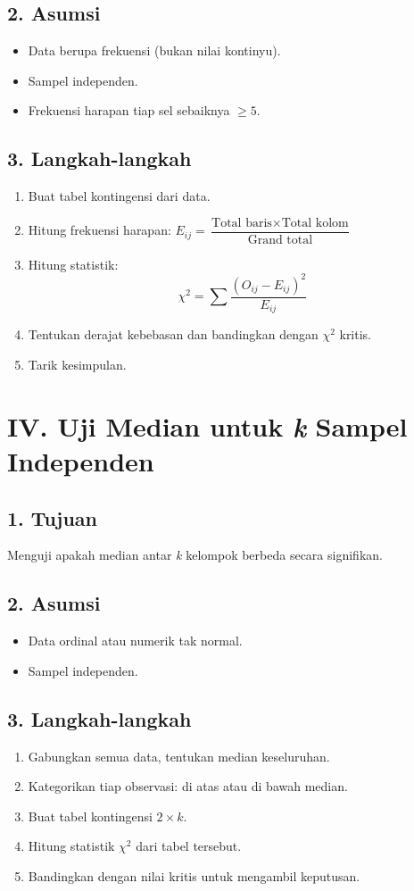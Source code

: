 \documentclass[12pt]{article}
\begin{document}
	\subsection*{2. Asumsi}
	\begin{itemize}
		\item Data berupa frekuensi (bukan nilai kontinyu).
		\item Sampel independen.
		\item Frekuensi harapan tiap sel sebaiknya $\geq 5$.
	\end{itemize}
	
	\subsection*{3. Langkah-langkah}
	\begin{enumerate}
		\item Buat tabel kontingensi dari data.
		\item Hitung frekuensi harapan: $E_{ij} = \dfrac{\text{Total baris} \times \text{Total kolom}}{\text{Grand total}}$
		\item Hitung statistik:
		\[
		\chi^2 = \sum \frac{(O_{ij} - E_{ij})^2}{E_{ij}}
		\]
		\item Tentukan derajat kebebasan dan bandingkan dengan $\chi^2$ kritis.
		\item Tarik kesimpulan.
	\end{enumerate}
	
	\section*{IV. Uji Median untuk \textit{k} Sampel Independen}
	\subsection*{1. Tujuan}
	Menguji apakah median antar \textit{k} kelompok berbeda secara signifikan.
	
	\subsection*{2. Asumsi}
	\begin{itemize}
		\item Data ordinal atau numerik tak normal.
		\item Sampel independen.
	\end{itemize}
	
	\subsection*{3. Langkah-langkah}
	\begin{enumerate}
		\item Gabungkan semua data, tentukan median keseluruhan.
		\item Kategorikan tiap observasi: di atas atau di bawah median.
		\item Buat tabel kontingensi $2 \times k$.
		\item Hitung statistik $\chi^2$ dari tabel tersebut.
		\item Bandingkan dengan nilai kritis untuk mengambil keputusan.
	\end{enumerate}
	
\end{document}
